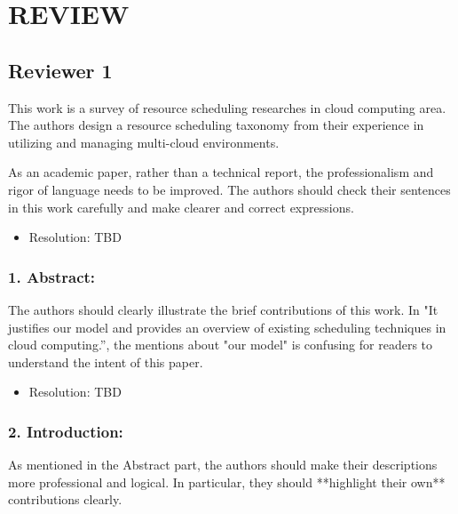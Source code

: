 \section {REVIEW}

\newcommand{\RESOLUTION}[1]{\color{red}\begin{itemize} \item Resolution: #1\end{itemize}\color{black}}

\newcommand{\OK}[1]{\color{blue}\begin{itemize} \item Resolution: #1\end{itemize}\color{black}}


\subsection{Reviewer 1}

This work is a survey of resource scheduling researches in cloud
computing area. The authors design a resource scheduling taxonomy from
their experience in utilizing and managing multi-cloud environments.


As an academic paper, rather than a technical report, the
professionalism and rigor of language needs to be improved. The
authors should check their sentences in this work carefully and make
clearer and correct expressions. 

\RESOLUTION{TBD}

\subsubsection{1. Abstract:}

The authors should clearly illustrate the brief
contributions of this work. In "It justifies our model and provides an
overview of existing scheduling techniques in cloud computing.”, the
mentions about "our model" is confusing for readers to understand the
intent of this paper.

\RESOLUTION{TBD}


\subsubsection{2. Introduction:}

As mentioned in the Abstract part, the authors should
make their descriptions more professional and logical. In particular,
they should **highlight their own** contributions clearly.

